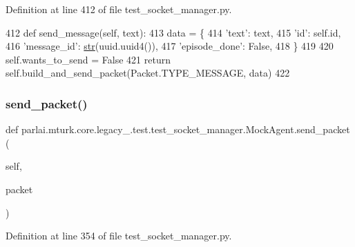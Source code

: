 Definition at line 412 of file test\+\_\+socket\+\_\+manager.\+py.


\begin{DoxyCode}
412     \textcolor{keyword}{def }send\_message(self, text):
413         data = \{
414             \textcolor{stringliteral}{'text'}: text,
415             \textcolor{stringliteral}{'id'}: self.id,
416             \textcolor{stringliteral}{'message\_id'}: \hyperlink{namespacegenerate__task__READMEs_a5b88452ffb87b78c8c85ececebafc09f}{str}(uuid.uuid4()),
417             \textcolor{stringliteral}{'episode\_done'}: \textcolor{keyword}{False},
418         \}
419 
420         self.wants\_to\_send = \textcolor{keyword}{False}
421         \textcolor{keywordflow}{return} self.build\_and\_send\_packet(Packet.TYPE\_MESSAGE, data)
422 
\end{DoxyCode}
\mbox{\label{classparlai_1_1mturk_1_1core_1_1legacy__2018_1_1test_1_1test__socket__manager_1_1MockAgent_a84f2bd95d9fbef45b8618ce49c4de9be}} 
\subsubsection{\texorpdfstring{send\+\_\+packet()}{send\_packet()}}
{\footnotesize\ttfamily def parlai.\+mturk.\+core.\+legacy\+\_.\+test.\+test\+\_\+socket\+\_\+manager.\+Mock\+Agent.\+send\+\_\+packet (\begin{DoxyParamCaption}\item[{}]{self,  }\item[{}]{packet }\end{DoxyParamCaption})}



Definition at line 354 of file test\+\_\+socket\+\_\+manager.\+py.


